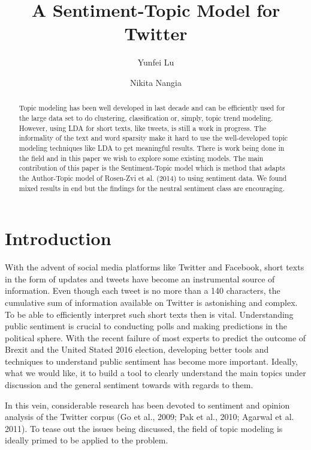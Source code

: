 \documentclass[12pt]{amsart}
\title[author-LDA with sentiment]
{A Sentiment-Topic Model for Twitter}
\author{Yunfei Lu}
\author{Nikita Nangia}
\newcommand{\0}{\mat{0}}
\newcommand{\1}{\mathds{1}}
\begin{document}
\begin{abstract}
  Topic modeling has been well developed in last decade and can be efficiently used for the large data set to do clustering, classification or, simply, topic trend modeling. However, using LDA for short texts, like tweets, is still a work in progress. The informality of the text and word sparsity make it hard to use the well-developed topic modeling techniques like LDA to get meaningful results. There is work being done in the field and in this paper we wish to explore some existing models. The main contribution of this paper is the Sentiment-Topic model which is method that adapts the Author-Topic model of Rosen-Zvi et al. (2014) to using sentiment data. We found mixed results in end but the findings for the neutral sentiment class are encouraging.
  
\end{abstract}

\maketitle

\section{Introduction}
With the advent of social media platforms like Twitter and Facebook, short texts in the form of updates and tweets have become an instrumental source of information. Even though each tweet is no more than a 140 characters, the cumulative sum of information available on Twitter is astonishing and complex. To be able to efficiently interpret such short texts then is vital. Understanding public sentiment is crucial to conducting polls and making predictions in the political sphere. With the recent failure of most experts to predict the outcome of Brexit and the United Stated 2016 election, developing better tools and techniques to understand public sentiment has become more important. Ideally, what we would like, it to build a tool to clearly understand the main topics under discussion and the general sentiment towards with regards to them.

In this vein, considerable research has been devoted to sentiment and opinion analysis of the Twitter corpus (Go et al., 2009; Pak et al., 2010; Agarwal et al. 2011). To tease out the issues being discussed, the field of topic modeling is ideally primed to be applied to the problem. 
\end{document}
